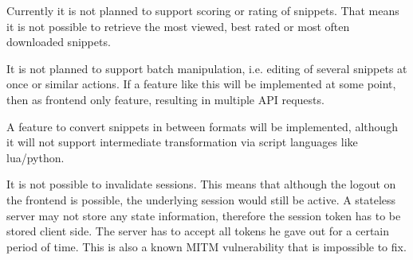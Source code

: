 Currently it is not planned to support scoring or rating of snippets. That means it is not possible to retrieve the most viewed, best rated or most often downloaded snippets.

It is not planned to support batch manipulation, i.\+e. editing of several snippets at once or similar actions. If a feature like this will be implemented at some point, then as frontend only feature, resulting in multiple A\+PI requests.

A feature to convert snippets in between formats will be implemented, although it will not support intermediate transformation via script languages like lua/python.

It is not possible to invalidate sessions. This means that although the logout on the frontend is possible, the underlying session would still be active. A stateless server may not store any state information, therefore the session token has to be stored client side. The server has to accept all tokens he gave out for a certain period of time. This is also a known M\+I\+TM vulnerability that is impossible to fix. 